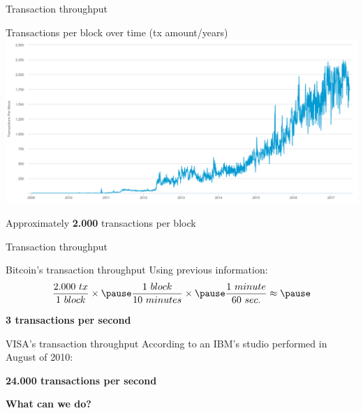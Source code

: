 \documentclass{beamer}
\begin{document}
\begin{frame}{Transaction throughput}
 \begin{center}
  Transactions per block over time (tx amount/years)\\
  \includegraphics[width=\textwidth, height=0.8\textheight, keepaspectratio]{img/chart_block_transactions.png}
 \end{center}
 \pause
 \begin{center}
  Approximately \textbf{2.000} transactions per block
 \end{center}
\end{frame}
\begin{frame}{Transaction throughput}
 \begin{block}{Bitcoin's transaction throughput}
  Using previous information:
  \pause
  \begin{displaymath}
   \frac{2.000\ tx}{1\ block} \times \pause
   \frac{1\ block}{10\ minutes} \times \pause
   \frac{1\ minute}{60\ sec.} \approx \pause
  \end{displaymath}
  \begin{center}
   \textbf{3 transactions per second}
  \end{center}
 \end{block}
 \pause
 \begin{block}{VISA's transaction throughput}
  According to an IBM's studio performed in August of 2010:\pause
  \begin{center}
   \textbf{24.000 transactions per second}
  \end{center}
 \end{block}
\end{frame}
\begin{frame}
 \begin{center}
  \textbf{What can we do?}
 \end{center}
\end{frame}
\end{document}
